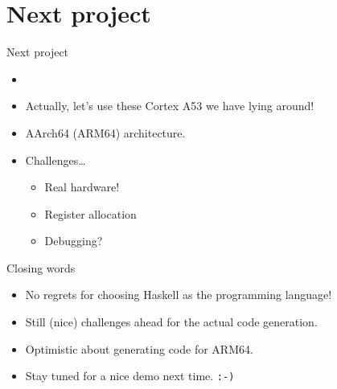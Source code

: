 \documentclass[department=icis, slidenumbers=slide, official=true]{beamerruhuisstijl}
\begin{document}
\section{Next project}
\begin{frame}{Next project}
    \begin{itemize}[<+->]
        \setlength\itemsep{1em}

        \item
        \item
            Actually, let's use these Cortex A53 we have lying around!
        \item
            AArch64 (ARM64) architecture.
        \item
            Challenges\ldots
            \begin{itemize}[<+->]
                \item Real hardware!
                \item Register allocation
                \item Debugging?
            \end{itemize}
    \end{itemize}
\end{frame}

\begin{frame}{Closing words}
    \begin{itemize}[<+->]
        \setlength\itemsep{1em}

        \item No regrets for choosing Haskell as the programming language!

        \item Still (nice) challenges ahead for the actual code generation.

        \item Optimistic about generating code for ARM64.

        \item Stay tuned for a nice demo next time. \texttt{:-)}
    \end{itemize}
\end{frame}
\end{document}
